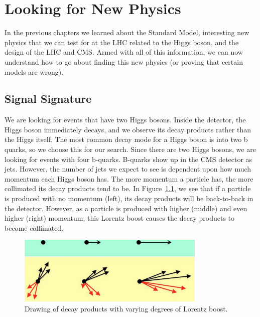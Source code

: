 \chapter{Looking for New Physics}\label{Sec:BSM}

In the previous chapters we learned about the Standard Model, interesting new physics that we can test for at the LHC related to the Higgs boson, and the design of the LHC and CMS. Armed with all of this information, we can now understand how to go about finding this new physics (or proving that certain models are wrong).
\vspace{5mm}

\section{Signal Signature}

We are looking for events that have two Higgs bosons. Inside the detector, the Higgs boson immediately decays, and we observe its decay products rather than the Higgs itself. The most common decay mode for a Higgs boson is into two b quarks, so we choose this for our search. Since there are two Higgs bosons, we are looking for events with four b-quarks. B-quarks show up in the CMS detector as jets. However, the number of jets we expect to see is dependent upon how much momentum each Higgs boson has. The more momentum a particle has, the more collimated its decay products tend to be. In Figure~\ref{Fig:lorentzboost}, we see that if a particle is produced with no momentum (left), its decay products will be back-to-back in the detector. However, as a particle is produced with higher (middle) and even higher (right) momentum, this Lorentz boost causes the decay products to become collimated. 
\begin{figure}[h!]
    \centering
        \includegraphics[width=0.8\textwidth]{F4/boost.png}
        \caption{Drawing of decay products with varying degrees of Lorentz boost.}
        \label{Fig:lorentzboost}
\end{figure}

